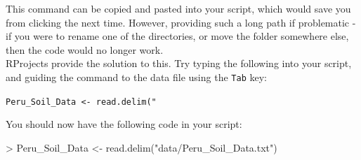 \documentclass[a4paper,12pt]{article}
\begin{document}
This command can be copied and pasted into your script, which would save you from clicking the next time. However, providing such a long path if problematic - if you were to rename one of the directories, or move the folder somewhere else, then the code would no longer work. \\

RProjects provide the solution to this. Try typing the following into your script, and guiding the command to the data file using the \texttt{Tab} key:

\begin{shaded}
\texttt{Peru\_Soil\_Data <- read.delim("}
\end{shaded}

You should now have the following code in your script:

\begin{shaded}
\begin{Schunk}
\begin{Sinput}
> Peru_Soil_Data <- read.delim("data/Peru_Soil_Data.txt")
\end{Sinput}
\end{Schunk}
\end{shaded}
\end{document}
